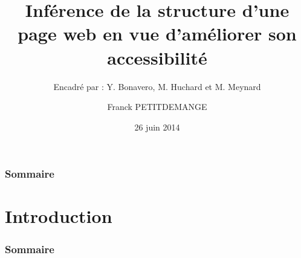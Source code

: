 \documentclass[9pt]{beamer}
\begin{document}
\title[Inférence de la structure d'une page web]{Inférence de la structure d'une page web en vue d'améliorer son accessibilité}
\subtitle[\ldots]{Encadré par : Y. Bonavero, M. Huchard et M. Meynard}
\author[Franck PETITDEMANGE]{Franck PETITDEMANGE}
\date{26 juin 2014}




\begin{frame}
\titlepage
\end{frame}

\begin{frame}
  \frametitle{Sommaire}
  \tableofcontents[hideothersubsections]
\end{frame}

\section{Introduction} 
\begin{frame}
  \frametitle{Sommaire}
\end{frame}
\end{document}
